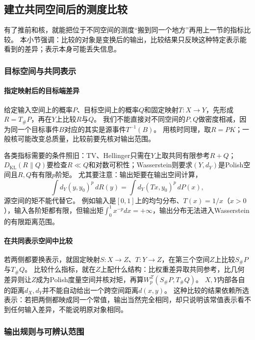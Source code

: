 \subsection{建立共同空间后的测度比较}

有了推前和核，就能把位于不同空间的测度“搬到同一个地方”再用上一节的指标比较。
本小节强调：比较的对象是变换后的输出，比较结果只反映这种特定表示能看到的差异；表示本身可能丢失信息。

\subsubsection{目标空间与共同表示}

\paragraph{指定映射后的目标端差异}

给定输入空间上的概率$P$、目标空间上的概率$Q$和固定映射$T:X\to Y$，先形成$R=T_\#P$，再在$Y$上比较$R$与$Q$。
我们不能直接对不同空间的$P,Q$做密度相减，因为同一个目标事件$B$对应的其实是源事件$T^{-1}(B)$。
用核时同理，取$R=PK$；一般核可能改变总质量，比较前要先核对输出范围。

各类指标需要的条件照旧：TV、Hellinger只需在$Y$上取共同有限参考$R+Q$；$D_{\mathrm{KL}}(R\|Q)$要检查$R\ll Q$和对数可积性；Wasserstein则要求$(Y,d_Y)$是Polish空间且$R,Q$有有限$p$阶矩。
尤其要注意：输出矩要在输出空间计算，
\[
 \int d_Y(y,y_0)^p\,dR(y)=\int d_Y(Tx,y_0)^p\,dP(x),
\]
源空间的矩不能代替它。
例如输入是$[0,1]$上的均匀分布、$T(x)=1/x$（$x>0$），输入各阶矩都有限，但输出矩$\int_0^1x^{-p}dx=+\infty$，输出分布无法进入Wasserstein的有限距离范围。

\paragraph{在共同表示空间中比较}

若两侧都要换表示，就固定映射$S:X\to Z$、$T:Y\to Z$，在第三个空间$Z$上比较$S_\#P$与$T_\#Q$。
比较什么指标，就在$Z$上配什么结构：比权重差异取共同参考，比几何差异则让$Z$成为Polish度量空间并核对矩，再算$W_p^Z(S_\#P,T_\#Q)$。
$X,Y$内部各自的距离$d_X,d_Y$并不能自动给出一个跨空间距离$d(x,y)$。
这种比较的结果依赖所选表示：若把两侧都映成同一个常值，输出当然完全相同，却只说明该常值表示看不到任何输入差异，不能说明原对象相同。

\subsubsection{输出规则与可辨认范围}

